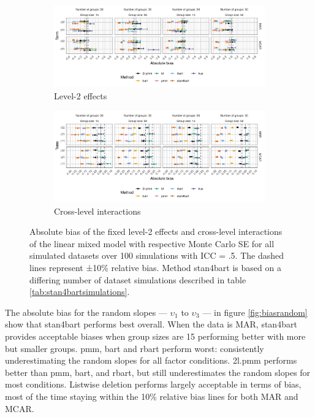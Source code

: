 \documentclass[3p,12pt,a4paper]{elsarticle}
\begin{document}
\begin{figure}[H]
    \centering 
    \begin{subfigure}[b]{1\textwidth}
        \centering
        \includegraphics[width=1\textwidth]{biaslevel2.png}
        \caption{Level-2 effects}
        \label{fig:biaslevel2}
    \end{subfigure}
    \begin{subfigure}[b]{1\textwidth}
        \centering
        \includegraphics[width=1\textwidth]{biascrosslevel.png}
        \caption{Cross-level interactions}
        \label{fig:biascrosslevel}
    \end{subfigure}
    \caption{Absolute bias of the fixed level-2 effects and cross-level interactions of the linear mixed model with respective Monte Carlo SE for all simulated datasets over 100 simulations with ICC = .5. The dashed lines represent ±10\% relative bias. Method stan4bart is based on a differing number of dataset simulations described in table \ref{tab:stan4bartsimulations}.}
    \label{fig:biaslevel2crosslevel}
\end{figure}

The absolute bias for the random slopes --- $\upsilon_1$ to $\upsilon_3$ --- in figure \ref{fig:biasrandom} show that stan4bart performs best overall. When the data is MAR, stan4bart provides acceptable biases when group sizes are 15 performing better with more but smaller groups. pmm, bart and rbart perform worst: consistently underestimating the random slopes for all factor conditions. 2l.pmm performs better than pmm, bart, and rbart, but still underestimates the random slopes for most conditions. Listwise deletion performs largely acceptable in terms of bias, most of the time staying within the 10\% relative bias lines for both MAR and MCAR.
\end{document}
